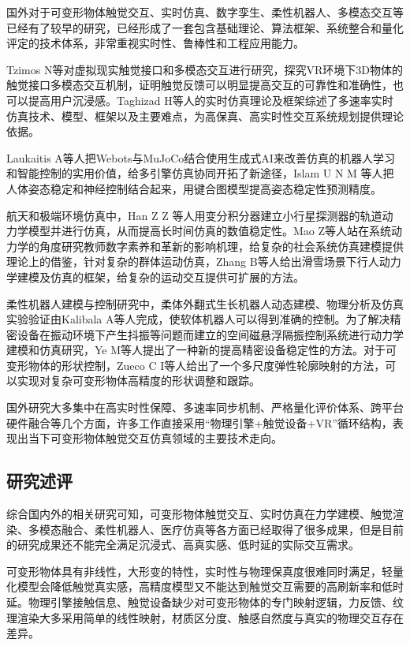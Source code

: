 国外对于可变形物体触觉交互、实时仿真、数字孪生、柔性机器人、多模态交互等已经有了较早的研究，已经形成了一套包含基础理论、算法框架、系统整合和量化评定的技术体系，非常重视实时性、鲁棒性和工程应用能力。

Tzimos
N等对虚拟现实触觉接口和多模态交互进行研究，探究VR环境下3D物体的触觉接口多模态交互机制，证明触觉反馈可以明显提高交互的可靠性和准确性，也可以提高用户沉浸感\cite{ref17}。Taghizad
H等人的实时仿真理论及框架综述了多速率实时仿真技术、模型、框架以及主要难点，为高保真、高实时性交互系统规划提供理论依据\cite{ref18}。

Laukaitis
A等人把Webots与MuJoCo结合使用生成式AI来改善仿真的机器人学习和智能控制的实用价值，给多引擎仿真协同开拓了新途径\cite{ref19}，Islam
U N M
等人把人体姿态稳定和神经控制结合起来，用键合图模型提高姿态稳定性预测精度\cite{ref20}。

航天和极端环境仿真中，Han Z Z
等人用变分积分器建立小行星探测器的轨道动力学模型并进行仿真，从而提高长时间仿真的数值稳定性\cite{ref21}。Mao
Z等人站在系统动力学的角度研究教师数字素养和革新的影响机理，给复杂的社会系统仿真建模提供理论上的借鉴\cite{ref22}，针对复杂的群体运动仿真，Zhang
B等人给出滑雪场景下行人动力学建模及仿真的框架，给复杂的运动交互提供可扩展的方法\cite{ref23}。

柔性机器人建模与控制研究中，柔体外翻式生长机器人动态建模、物理分析及仿真实验验证由Kalibala
A等人完成，使软体机器人可以得到准确的控制\cite{ref24}。为了解决精密设备在振动环境下产生抖振等问题而建立的空间磁悬浮隔振控制系统进行动力学建模和仿真研究，Ye
M等人提出了一种新的提高精密设备稳定性的方法\cite{ref25}。对于可变形物体的形状控制，Zueco
C
I等人给出了一个多尺度弹性轮廓映射的方法，可以实现对复杂可变形物体高精度的形状调整和跟踪\cite{ref26}。

国外研究大多集中在高实时性保障、多速率同步机制、严格量化评价体系、跨平台硬件融合等几个方面，许多工作直接采用``物理引擎+触觉设备+VR''循环结构，表现出当下可变形物体触觉交互仿真领域的主要技术走向。

\subsection{研究述评}

综合国内外的相关研究可知，可变形物体触觉交互、实时仿真在力学建模、触觉渲染、多模态融合、柔性机器人、医疗仿真等各方面已经取得了很多成果，但是目前的研究成果还不能完全满足沉浸式、高真实感、低时延的实际交互需求。

可变形物体具有非线性，大形变的特性，实时性与物理保真度很难同时满足，轻量化模型会降低触觉真实感，高精度模型又不能达到触觉交互需要的高刷新率和低时延。物理引擎接触信息、触觉设备缺少对可变形物体的专门映射逻辑，力反馈、纹理渲染大多采用简单的线性映射，材质区分度、触感自然度与真实的物理交互存在差异。


